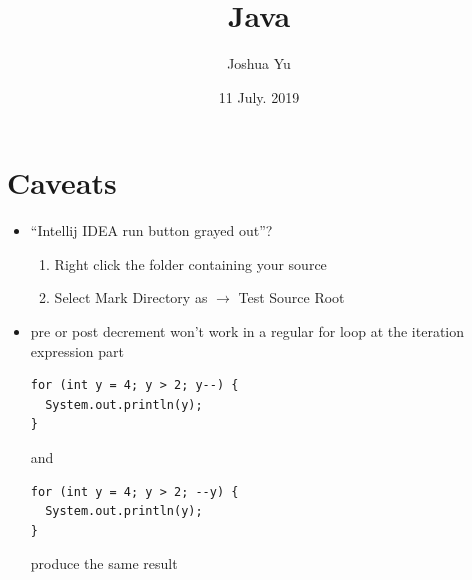 \documentclass[a4paper, 12pt]{article}
\begin{document}

\large
\title{Java}
\author{Joshua Yu}
\date{11 July. 2019}
\maketitle
\tableofcontents


\section{Caveats}
\begin{itemize}
\item ``Intellij IDEA run button grayed out''?
\begin{enumerate}
\item Right click the folder containing your source
\item Select Mark Directory as $\rightarrow$ Test Source Root
\end{enumerate}

\item pre or post decrement won't work in a regular for loop at the iteration expression part
\begin{verbatim}
for (int y = 4; y > 2; y--) {
  System.out.println(y);
}
\end{verbatim}
and
\begin{verbatim}
for (int y = 4; y > 2; --y) {
  System.out.println(y);
}
\end{verbatim}
produce the same result

\end{itemize}
\end{document}
